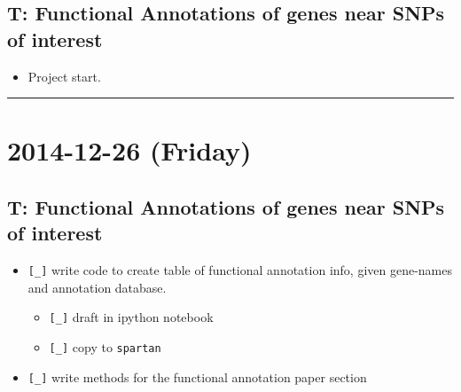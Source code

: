 \documentclass[letterpaper]{scrartcl}
\begin{document}
\subsection{T: Functional Annotations of genes near SNPs of
interest}\label{t-functional-annotations-of-genes-near-snps-of-interest}

\begin{itemize}
\itemsep1pt\parskip0pt
\item
  Project start.
\end{itemize}

\begin{center}\rule{0.5\linewidth}{\linethickness}\end{center}

\section{2014-12-26 (Friday)}\label{friday}

\subsection{T: Functional Annotations of genes near SNPs of
interest}\label{t-functional-annotations-of-genes-near-snps-of-interest-1}

\begin{itemize}
\itemsep1pt\parskip0pt
\item
  \texttt{{[}\_{]}} write code to create table of functional annotation
  info, given gene-names and annotation database.

  \begin{itemize}
  \itemsep1pt\parskip0pt
  \item
    \texttt{{[}\_{]}} draft in ipython notebook
  \item
    \texttt{{[}\_{]}} copy to \texttt{spartan}
  \end{itemize}
\item
  \texttt{{[}\_{]}} write methods for the functional annotation paper
  section
\end{itemize}
\end{document}
